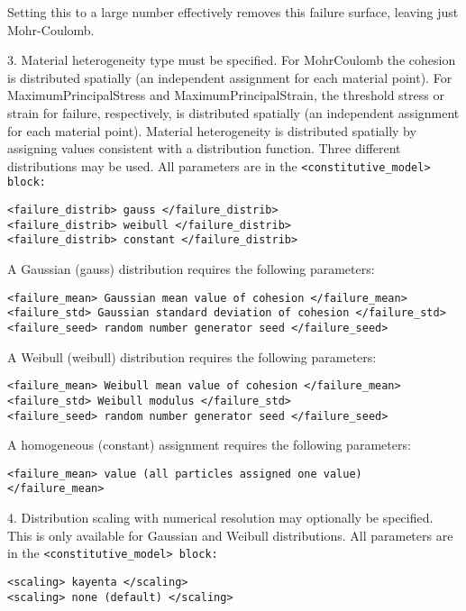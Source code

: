 \begin{enumerate}
Setting this to a large number effectively removes this failure surface, leaving just Mohr-Coulomb.

3. Material heterogeneity type must be specified.  For MohrCoulomb the cohesion is distributed 
spatially (an independent assignment for each material point).  For MaximumPrincipalStress and 
MaximumPrincipalStrain, the threshold stress or strain for failure, respectively, is distributed 
spatially (an independent assignment for each material point).  Material heterogeneity is 
distributed spatially by assigning values consistent with a distribution function.  Three different 
distributions may be used.  All parameters are in the \tt <constitutive\_model> \normalfont block:

\begin{Verbatim}[fontsize=\footnotesize]
<failure_distrib> gauss </failure_distrib>
<failure_distrib> weibull </failure_distrib>
<failure_distrib> constant </failure_distrib>
\end{Verbatim}

A Gaussian (gauss) distribution requires the following parameters:

\begin{Verbatim}[fontsize=\footnotesize]
<failure_mean> Gaussian mean value of cohesion </failure_mean>
<failure_std> Gaussian standard deviation of cohesion </failure_std>
<failure_seed> random number generator seed </failure_seed>
\end{Verbatim}

A Weibull (weibull) distribution requires the following parameters:
\begin{Verbatim}[fontsize=\footnotesize]
<failure_mean> Weibull mean value of cohesion </failure_mean>
<failure_std> Weibull modulus </failure_std>
<failure_seed> random number generator seed </failure_seed>
\end{Verbatim}

A homogeneous (constant) assignment requires the following parameters:
\begin{Verbatim}[fontsize=\footnotesize]
<failure_mean> value (all particles assigned one value) </failure_mean>
\end{Verbatim}

4. Distribution scaling with numerical resolution may optionally be specified.  This is only 
available for Gaussian and Weibull distributions.  All parameters are in the 
\tt <constitutive\_model> \normalfont block:

\begin{Verbatim}[fontsize=\footnotesize]
<scaling> kayenta </scaling>
<scaling> none (default) </scaling>
\end{Verbatim}


\end{enumerate}
